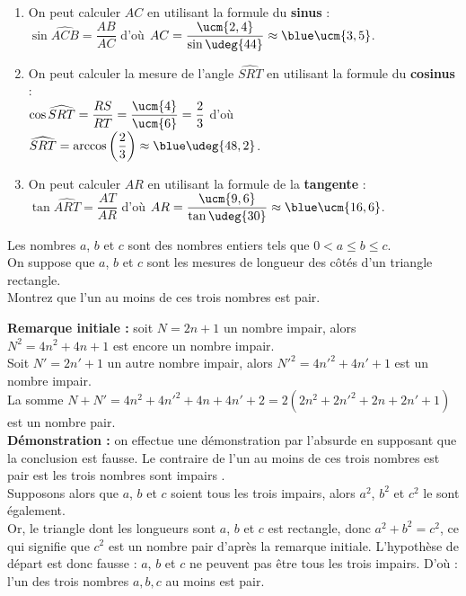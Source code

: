 \begin{corrige}
\ \\ [-5mm]
   \begin{enumerate}
      \item On peut calculer $AC$ en utilisant la formule du \textbf{sinus} : \\ [1mm]
         $\sin\widehat{ACB}=\dfrac{AB}{AC}$ d'où $AC =\dfrac{\ucm{2,4}}{\sin \udeg{44}} \approx {\blue  \ucm{3,5}}$. \smallskip
      \item On peut calculer la mesure de l'angle $\widehat{SRT}$ en utilisant la formule du \textbf{cosinus} : \\ [1mm]
         $\cos \widehat{SRT}=\dfrac{RS}{RT} =\dfrac{\ucm{4}}{\ucm{6}} =\dfrac23$ d'où $\widehat{SRT} =\arccos\left(\dfrac23\right) \approx {\blue \udeg{48,2}}$. \smallskip
      \item On peut calculer $AR$ en utilisant la formule de la \textbf{tangente} : \\ [1mm]
         $\tan\widehat{ART}=\dfrac{AT}{AR}$ d'où $AR =\dfrac{\ucm{9,6}}{\tan \udeg{30}} \approx {\blue \ucm{16,6}}$.
   \end{enumerate}
\end{corrige}

\bigskip


\begin{exercice} %
   Les nombres $a$, $b$ et $c$ sont des nombres entiers tels que $0 < a \leq b \leq c$. \\
   On suppose que $a$, $b$ et $c$ sont les mesures de longueur des côtés d'un triangle rectangle. \\
   Montrez que l'un au moins de ces trois nombres est pair.
\end{exercice}

\begin{corrige}
   {\bf Remarque initiale :} soit $N =2n+1$ un nombre impair, alors $N^2 =4n^2+4n+1$ est encore un nombre impair. \\
   Soit $N'=2n'+1$ un autre nombre impair, alors $N'^2 =4n'^2+4n'+1$ est un nombre impair. \\
   La somme $N+N'=4n^2+4n'^2+4n+4n'+2 =2(2n^2+2n'^2+2n+2n'+1)$ est un nombre pair. \\ [2mm]
   {\bf Démonstration :} on effectue une démonstration par l'absurde en supposant que la conclusion est fausse. Le contraire de \og l’un au moins de ces trois nombres est pair \fg{} est \og les trois nombres sont impairs \fg. \\
   Supposons alors que $a$, $b$ et $c$ soient tous les trois impairs, alors $a^2$, $b^2$ et $c^2$ le sont également. \\
   Or, le triangle dont les longueurs sont $a$, $b$ et $c$ est rectangle, donc $a^2 + b^2 = c^2$, ce qui signifie que $c^2$ est un nombre pair d'après la remarque initiale. L'hypothèse de départ est donc fausse : $a$, $b$ et $c$ ne peuvent pas être tous les trois impairs. D'où : {\blue l'un des trois nombres $a, b, c$ au moins est pair.}
\end{corrige}

